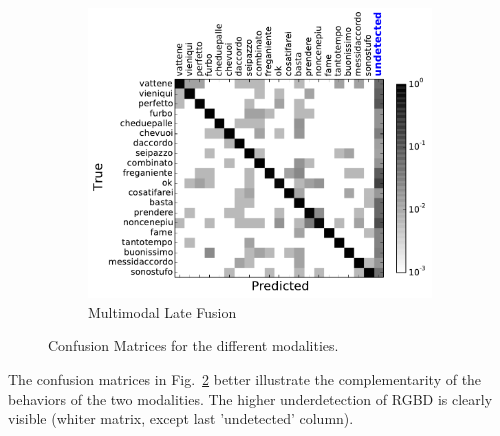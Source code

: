 \begin{figure}[t]
        ~ %
        \begin{subfigure}[c]{0.36\textwidth}
                \includegraphics[width=\textwidth]{images/cm/cm_combination}
\vspace*{-3mm}
                \caption{Multimodal Late Fusion}
                \label{fusion_cm}
        \end{subfigure}

  \caption{Confusion Matrices  for the different modalities.}
\label{fig:confusion_matrix}
\end{figure}

%
The confusion matrices in Fig.~\ref{fig:confusion_matrix} better illustrate the complementarity of the behaviors of the two modalities.
%
The higher underdetection of RGBD is clearly visible (whiter matrix, except last 'undetected' column).
%

